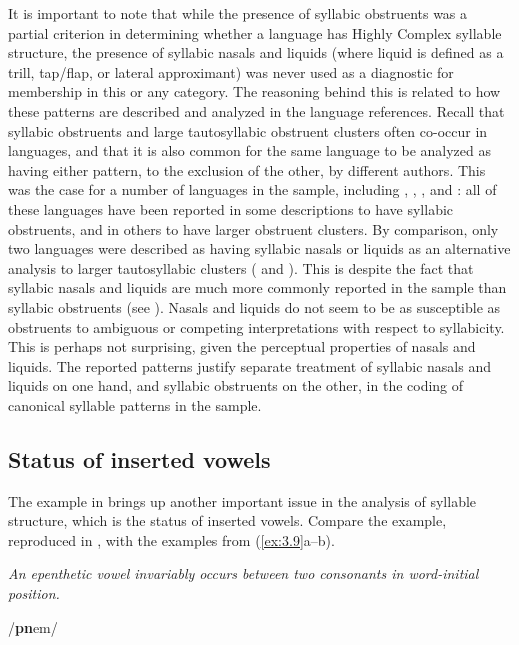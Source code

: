   It is important to note that while the presence of syllabic obstruents was a partial criterion in determining whether a language has Highly Complex syllable structure, the presence of syllabic nasals and liquids (where liquid is defined as a trill, tap/flap, or lateral approximant) was never used as a diagnostic for membership in this or any category. The reasoning behind this is related to how these patterns are described and analyzed in the language references. Recall that syllabic obstruents and large tautosyllabic obstruent clusters often co-occur in languages, and that it is also common for the same language to be analyzed as having either pattern, to the exclusion of the other, by different authors. This was the case for a number of languages in the sample, including , , , and : all of these languages have been reported in some descriptions to have syllabic obstruents, and in others to have larger obstruent clusters. By comparison, only two languages were described as having syllabic nasals or liquids as an alternative analysis to larger tautosyllabic clusters ( and ). This is despite the fact that syllabic nasals and liquids are much more commonly reported in the sample than syllabic obstruents (see ). Nasals and liquids do not seem to be as susceptible as obstruents to ambiguous or competing interpretations with respect to syllabicity. This is perhaps not surprising, given the perceptual properties of nasals and liquids. The reported patterns justify separate treatment of syllabic nasals and liquids on one hand, and syllabic obstruents on the other, in the coding of canonical syllable patterns in the sample.

\subsection{Status of inserted vowels}\label{sec:3.2.2}

  The  example in  brings up another important issue in the analysis of syllable structure, which is the status of inserted vowels. Compare the  example, reproduced in , with the examples from  (\ref{ex:3.9}a--b).

\ea\label{ex:3.8}

\textit{An epenthetic vowel invariably occurs between two consonants in word-initial position.}

/\textbf{pn}em/

